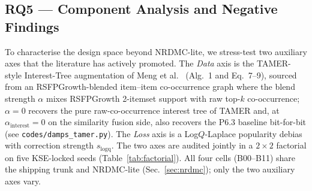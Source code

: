 \documentclass[conference]{IEEEtran}
\begin{document}
\begin{table}[!t]
\caption{RQ4 --- Recall@20 by item-popularity tercile on Amazon
Clothing, mean $\pm$ std over the five KSE-locked seeds. Tercile
split by training-set frequency; Head/Mid/Tail = top/middle/bottom
third with
$|\mathcal{I}_{\mathrm{head}}|=|\mathcal{I}_{\mathrm{mid}}|=7{,}678$,
$|\mathcal{I}_{\mathrm{tail}}|=7{,}677$.}
\label{tab:longtail}
\centering
\renewcommand{\arraystretch}{1.10}
\setlength{\tabcolsep}{3pt}
\end{table}

\subsection{RQ5 --- Component Analysis and Negative Findings}
\label{sec:factorial}

To characterise the design space beyond NRDMC-lite, we stress-test
two auxiliary axes that the literature has actively promoted. The
\emph{Data} axis is the TAMER-style Interest-Tree augmentation of
Meng et al.~\cite{meng2025tamer} (Alg.~1 and Eq.~7--9), sourced from
an RSFPGrowth-blended item--item co-occurrence graph where the blend
strength $\alpha$ mixes RSFPGrowth 2-itemset support with raw
top-$k$ co-occurrence; $\alpha{=}0$ recovers the pure raw-co-occurrence
interest tree of TAMER and, at $\alpha_{\text{interest}}{=}0$ on the
similarity fusion side, also recovers the P6.3 baseline bit-for-bit
(see \texttt{codes/damps\_tamer.py}). The \emph{Loss} axis is a
Log$Q$-Laplace popularity debias with correction strength
$s_{\text{logq}}$. The two axes are audited jointly in a
$2{\times}2$ factorial on five KSE-locked seeds
(Table~\ref{tab:factorial}). All four cells (B00--B11) share the
shipping trunk and NRDMC-lite (Sec.~\ref{sec:nrdmc}); only the two
auxiliary axes vary.
\end{document}
